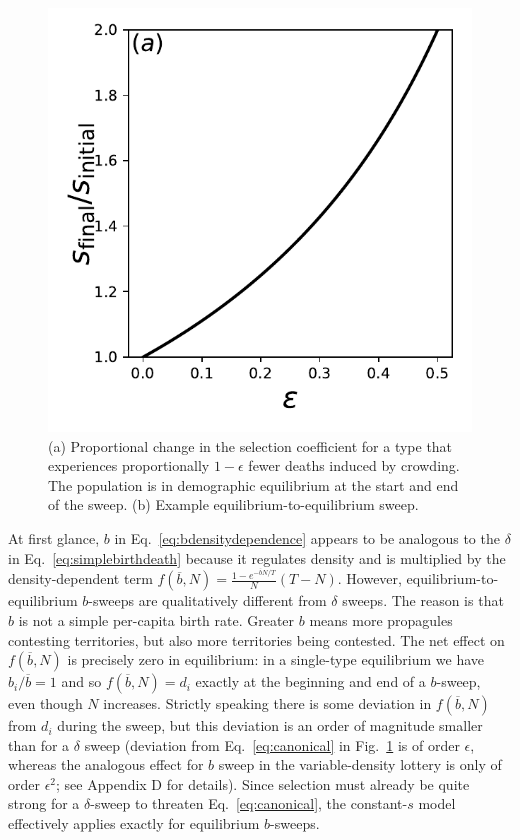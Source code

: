 \documentclass[12pt]{article}
\begin{document}
\begin{figure}
\centering
\includegraphics[scale=0.8]{strengthofselection.pdf}
\caption{\label{fig:strengthofselection} (a) Proportional change in the selection coefficient for a type that experiences proportionally $1-\epsilon$ fewer deaths induced by crowding. The population is in demographic equilibrium at the start and end of the sweep. (b) Example equilibrium-to-equilibrium sweep.}
\end{figure}

At first glance, $b$ in Eq.~\eqref{eq:bdensitydependence} appears to be analogous to the $\delta$ in Eq.~\eqref{eq:simplebirthdeath} because it regulates density and is multiplied by the density-dependent term $f(\overline{b},N)=\frac{1-e^{-\overline{b}N/T}}{N}(T-N)$. However, equilibrium-to-equilibrium $b$-sweeps are qualitatively different from $\delta$ sweeps. The reason is that $b$ is not a simple per-capita birth rate. Greater $b$ means more propagules contesting territories, but also more territories being contested. The net effect on $f(\overline{b},N)$ is precisely zero in equilibrium: in a single-type equilibrium we have $b_i/\overline{b}=1$ and so $f(\overline{b},N)=d_i$ exactly at the beginning and end of a $b$-sweep, even though $N$ increases. Strictly speaking there is some deviation in $f(\overline{b},N)$ from $d_i$ during the sweep, but this deviation is an order of magnitude smaller than for a $\delta$ sweep (deviation from Eq.~\eqref{eq:canonical} in Fig.~\ref{fig:strengthofselection} is of order $\epsilon$, whereas the analogous effect for $b$ sweep in the variable-density lottery is only of order $\epsilon^2$; see Appendix D for details). Since selection must already be quite strong for a $\delta$-sweep to threaten Eq.~\eqref{eq:canonical}, the constant-$s$ model effectively applies exactly for equilibrium $b$-sweeps. 
\end{document}
